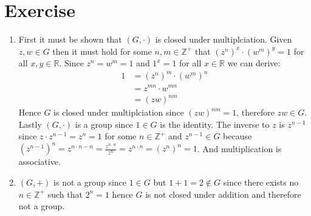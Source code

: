 \documentclass{article}
\begin{document}
\section{Exercise}
\begin{enumerate}[label=(\alph*)]
    \item First it must be shown that $(G, \cdot)$ is closed under
    multiplciation. Given $z, w \in G$ then it must hold for some $n, m \in
    \mathbb{Z}^+$ that $(z^n)^x \cdot (w^m)^y = 1$ for all $x, y \in
    \mathbb{R}$. Since $z^n = w^m = 1$ and $1^x = 1$ for all $x \in \mathbb{R}$
    we can derive:
    \begin{align*}
        1 &= \left(z^n\right)^m \cdot \left(w^m\right)^n \\
        &= z^{mn} \cdot w^{mn} \\
        &= \left(zw\right)^{nm} 
    \end{align*}
    Hence $G$ is closed under multiplciation since $\left(zw\right)^{nm} = 1$,
    therefore $zw \in G$. Lastly $(G, \cdot)$ is a group since $1 \in G$ is the
    identity. The inverse to $z$ is $z^{n - 1}$ since $z \cdot z^{n - 1} = z^n =
    1$ for some $n \in \mathbb{Z}^+$ and $z^{n - 1} \in G$ because $(z^{n -
    1})^n = z^{n \cdot n - n} = \frac{z^{n \cdot n}}{z^n} = z^{n \cdot n} =
    (z^{n})^n = 1$. And multiplication is associative.
    
    \item $(G, +)$ is not a group since $1 \in G$ but $1 + 1 = 2 \notin G$
    since there exists no $n \in \mathbb{Z}^+$ such that $2^n = 1$ hence $G$ is
    not closed under addition and therefore not a group.
\end{enumerate}
\end{document}
